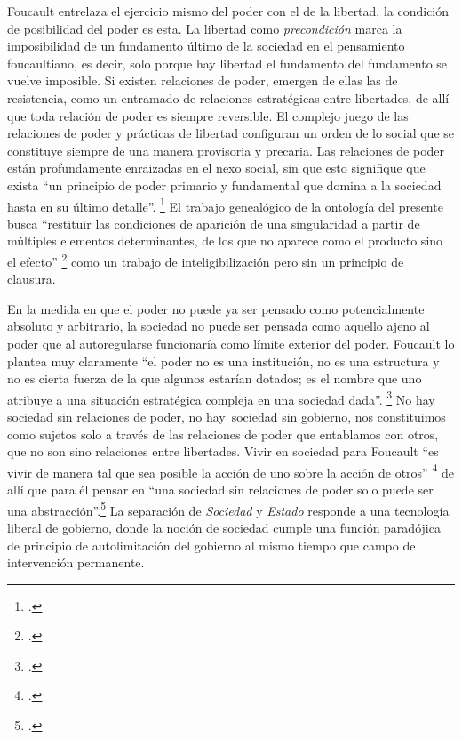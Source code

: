 Foucault entrelaza el ejercicio mismo del poder con el de la libertad, la condición de posibilidad del poder es esta. La libertad como \emph{precondición} marca la imposibilidad de un fundamento último de la sociedad en el pensamiento foucaultiano, es decir, solo porque hay libertad el fundamento del fundamento se vuelve imposible. Si existen relaciones de poder, emergen de ellas las de resistencia, como un entramado de relaciones estratégicas entre libertades, de allí que toda relación de poder es siempre reversible. El complejo juego de las relaciones de poder y prácticas de libertad configuran un orden de lo social que se constituye siempre de una manera provisoria y precaria. Las relaciones de poder están profundamente enraizadas en el nexo social, sin que esto signifique que exista \enquote{un principio de poder primario y fundamental que domina a la sociedad hasta en su último detalle}. \footcite[][256]{@7056-FOUCAULT2001} El trabajo genealógico de la ontología del presente busca \enquote{restituir las condiciones de aparición de una singularidad a partir de múltiples elementos determinantes, de los que no aparece como el producto sino el efecto} \footcite[][16]{@7042-FOUCAULT1995}
como un trabajo de inteligibilización pero sin un principio de clausura.

En la medida en que el poder no puede ya ser pensado como potencialmente absoluto y arbitrario, la sociedad no puede ser pensada como aquello ajeno al poder que al autoregularse funcionaría como límite exterior del poder. Foucault lo plantea muy claramente \enquote{el poder no es una institución, no es una estructura y no es cierta fuerza de la que algunos estarían dotados; es el nombre que uno atribuye a una situación estratégica compleja en una sociedad dada}. \footcite[][89]{@7059-FOUCAULT2010} No hay sociedad sin relaciones de poder, no hay~sociedad sin gobierno, nos constituimos como sujetos solo a través de las relaciones de poder que entablamos con otros, que no son sino relaciones entre libertades. Vivir en sociedad para Foucault \enquote{es vivir de manera tal que sea posible la acción de uno sobre la acción de otros} \footcite[][256]{@7056-FOUCAULT2001} de allí que para él pensar en \enquote{una sociedad sin relaciones de poder solo puede ser una abstracción}.\footcite[][256]{@7056-FOUCAULT2001} La separación de \emph{Sociedad} y \emph{Estado} responde a una tecnología liberal de gobierno, donde la noción de sociedad cumple una función paradójica de principio de autolimitación del gobierno al mismo tiempo que campo de intervención permanente.

